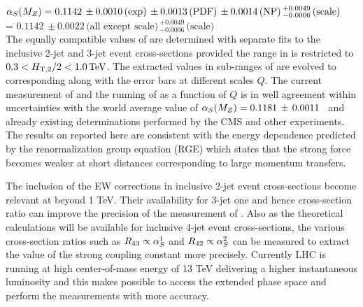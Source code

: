 $\alpha_S(M_Z) = 0.1142\,\pm0.0010\,\textrm{(exp)}\,\pm0.0013\,\textrm{(PDF)}\,\pm0.0014\,\textrm{(NP)}\,^{+0.0049}_{-0.0006}\,\textrm{(scale)}$ \\ \hspace*{24mm} = $0.1142\,\pm0.0022\,\textrm{(all except scale)}\,^{+0.0049}_{-0.0006}\,\textrm{(scale)}$\\ 
The equally compatible values of \alpsmz are determined with separate fits to the inclusive 2-jet and 3-jet event cross-sections provided the range in \httwo is restricted to $0.3 < H_{\mathrm{T,2}}/2 < 1.0\,\text{Te\hspace{-.08em}V}$. The extracted \alpsmz values in sub-ranges of \httwo are evolved to corresponding \alpsq along with the error bars at different scales $Q$. The current measurement of \alpsmz and the running of \alpsq as a function of $Q$ is in well agreement within uncertainties with the world average value of $\alpha_S(M_Z) = 0.1181 \,\pm\, 0.0011$~\cite{Patrignani:2016xqp} and already existing determinations performed by the CMS and other experiments. The results on \alps reported here are consistent with the energy dependence predicted by the renormalization group equation (RGE) \cite{Callan:1970yg} which states that the strong force becomes weaker at short distances corresponding to large momentum transfers.

The inclusion of the EW corrections in inclusive 2-jet event cross-sections become relevant at \httwo beyond 1 TeV. Their availability for 3-jet one and hence cross-section ratio \ratio can improve the precision of the measurement of \alpsmz. Also as the theoretical calculations will be available for inclusive 4-jet event cross-sections, the various cross-section ratios such as $R_{\rm 43} \propto \alpha_S^1$ and $R_{\rm 42} \propto \alpha_S^2$ can be measured to extract the value of the strong coupling constant more precisely. Currently LHC is running at high center-of-mass energy of 13 TeV delivering a higher instantaneous luminosity and this makes possible to access the extended phase space and perform the measurements with more accuracy.
